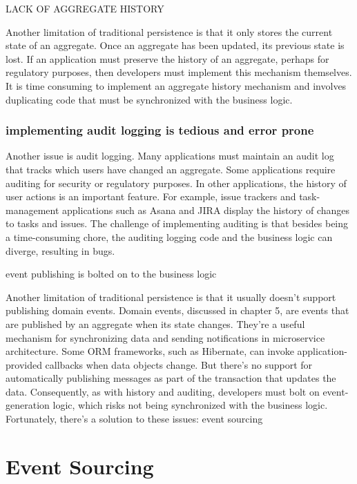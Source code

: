 LACK OF AGGREGATE HISTORY

Another limitation of traditional persistence is that it only stores the current state of
an aggregate. Once an aggregate has been updated, its previous state is lost. If an
application must preserve the history of an aggregate, perhaps for regulatory purposes, then developers must implement this mechanism themselves. It is time consuming to implement an aggregate history mechanism and involves duplicating code
that must be synchronized with the business logic.

\subsubsection{implementing audit logging is tedious and error prone}

Another issue is audit logging. Many applications must maintain an audit log that
tracks which users have changed an aggregate. Some applications require auditing for
security or regulatory purposes. In other applications, the history of user actions is an
important feature. For example, issue trackers and task-management applications
such as Asana and JIRA display the history of changes to tasks and issues. The challenge of implementing auditing is that besides being a time-consuming chore, the
auditing logging code and the business logic can diverge, resulting in bugs.

event publishing is bolted on to the business logic

Another limitation of traditional persistence is that it usually doesn’t support publishing
domain events. Domain events, discussed in chapter 5, are events that are published by
an aggregate when its state changes. They’re a useful mechanism for synchronizing data
and sending notifications in microservice architecture. Some ORM frameworks, such
as Hibernate, can invoke application-provided callbacks when data objects change.
But there’s no support for automatically publishing messages as part of the transaction that updates the data. Consequently, as with history and auditing, developers
must bolt on event-generation logic, which risks not being synchronized with the business logic. Fortunately, there’s a solution to these issues: event sourcing

\section{Event Sourcing}



